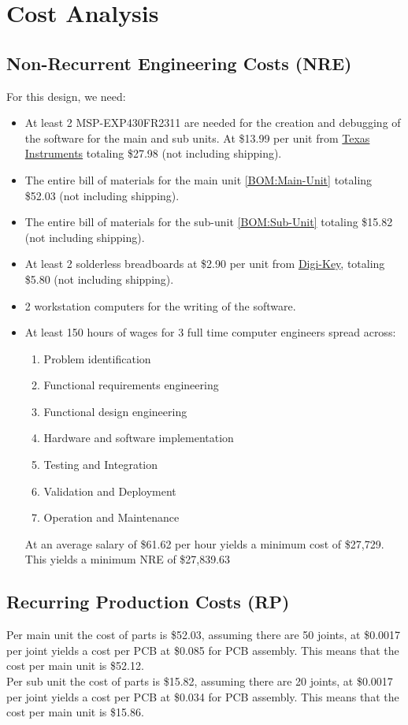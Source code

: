 \section{Cost Analysis}
\subsection{Non-Recurrent Engineering Costs (NRE)}
For this design, we need:

\begin{itemize}
  \item At least 2 MSP-EXP430FR2311 are needed for the creation and debugging of the software for the main and sub units. At \$13.99 per unit from \href{https://www.ti.com/tool/MSP-EXP430FR2311#order-start-development}{Texas Instruments} totaling \$27.98 (not including shipping).
  \item The entire bill of materials for the main unit \ref{BOM:Main-Unit} totaling \$52.03 (not including shipping).
  \item The entire bill of materials for the sub-unit \ref{BOM:Sub-Unit} totaling \$15.82 (not including shipping).
  \item At least 2 solderless breadboards at \$2.90 per unit from \href{https://www.digikey.com/en/products/detail/dfrobot/FIT0096/7597069}{Digi-Key}, totaling \$5.80 (not including shipping).
  \item 2 workstation computers for the writing of the software.
  \item At least 150 hours of wages for 3 full time computer engineers spread across:
        \begin{enumerate}
          \item Problem identification
          \item Functional requirements engineering
          \item Functional design engineering
          \item Hardware and software implementation
          \item Testing and Integration
          \item Validation and Deployment
          \item Operation and Maintenance
        \end{enumerate}
At an average salary of \$61.62 per hour \cite{ComputerHardwareEngineers} yields a minimum cost of \$27,729.
This yields a minimum NRE of \$27,839.63
\end{itemize}
\subsection{Recurring Production Costs (RP)}
Per main unit the cost of parts is \$52.03, assuming there are 50 joints, at \$0.0017 per joint yields a cost per PCB at \$0.085 for PCB assembly. This means that the cost per main unit is \$52.12.\\
Per sub unit the cost of parts is \$15.82, assuming there are 20 joints, at \$0.0017 per joint yields a cost per PCB at \$0.034 for PCB assembly. This means that the cost per main unit is \$15.86.\\
